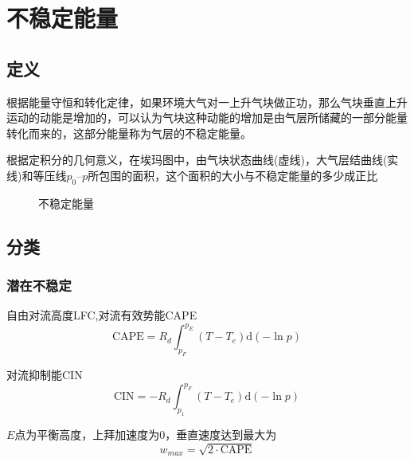 \documentclass[UTF8,a4paper,11pt,oneside]{ctexbook}
\begin{document}
\section{不稳定能量}

\subsection{定义}

根据能量守恒和转化定律，如果环境大气对一上升气块做正功，那么气块垂直上升运动的动能是增加的，可以认为气块这种动能的增加是由气层所储藏的一部分能量转化而来的，这部分能量称为气层的不稳定能量。

根据定积分的几何意义，在埃玛图中，由气块状态曲线(虚线)，大气层结曲线(实线)和等压线\(p_0\)--\(p\)所包围的面积，这个面积的大小与不稳定能量的多少成正比
\begin{figure}[htbp]
    \centering
    \caption{不稳定能量}
\end{figure}

\subsection{分类}
\subsubsection{潜在不稳定}
自由对流高度LFC,对流有效势能CAPE
\begin{equation}
\mathrm{CAPE}=R_d\int_{p_F}^{p_E}(T-T_e)\mathrm{d}(-\ln{}p)
\end{equation}

对流抑制能CIN
\begin{equation}
\mathrm{CIN}=-R_d\int_{p_1}^{p_F}(T-T_e)\mathrm{d}(-\ln{}p)
\end{equation}

\(E\)点为平衡高度，上拜加速度为0，垂直速度达到最大为
\begin{equation}
w_{max}=\sqrt{2\cdot{{}\mathrm{CAPE}}}
\end{equation}
\end{document}
